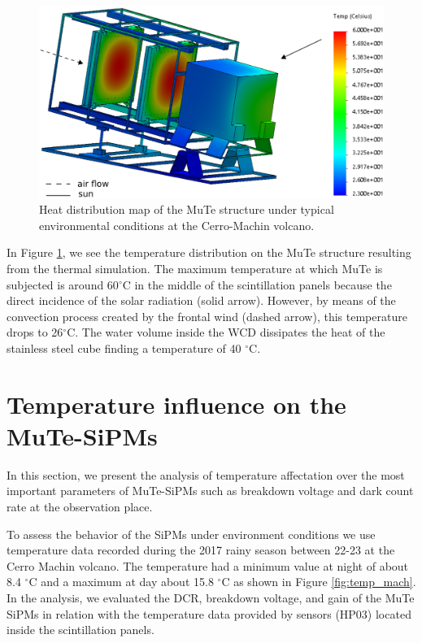 \documentclass[a4paper,11pt]{article}
\begin{document}
\begin{figure}[htbp]
\centering 
\includegraphics[width=.7\textwidth]{Figures/MuTe_Temp.eps}
\caption{Heat distribution map of the MuTe structure under typical environmental conditions at the Cerro-Machin volcano.}
\label{fig:detec} 
\end{figure}

In Figure \ref{fig:detec}, we see the temperature distribution on the MuTe structure resulting from the thermal simulation. The maximum temperature at which MuTe is subjected is around 60$^{\circ}$C in the middle of the scintillation panels because the direct incidence of the solar radiation (solid arrow). However, by means of the convection process created by the frontal wind (dashed arrow), this temperature drops to 26$^{\circ}$C. The water volume inside the WCD dissipates the heat of the stainless steel cube finding a temperature of 40 $^{\circ}$C.

\section{Temperature influence on the MuTe-SiPMs}
\label{sec:temp}

In this section, we present the analysis of temperature affectation over the most important parameters of MuTe-SiPMs such as breakdown voltage and dark count rate at the observation place.

To assess the behavior of the SiPMs under environment conditions we use temperature data recorded during the 2017 rainy season between 22-23 at the Cerro Machin volcano. The temperature had a minimum value at night of about 8.4 $^{\circ}$C and a maximum at day about 15.8 $^{\circ}$C as shown in Figure \ref{fig:temp_mach}. In the analysis, we evaluated the DCR, breakdown voltage, and gain of the MuTe SiPMs in relation with the temperature data provided by sensors (HP03) located inside the scintillation panels. 
\end{document}
